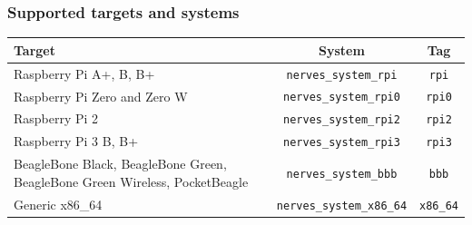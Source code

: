 \documentclass[10pt,xcolor=pdflatex,dvipsnames,table]{beamer}
\begin{document}
	\begin{frame}
		\frametitle{Supported targets and systems}

		\begin{center}
			\begin{tabular}{|p{3.2cm}|c|c|}\hline
				\textbf{Target}  & \textbf{System}  & \textbf{Tag} \\ \hline
				Raspberry Pi A+, B, B+  & \texttt{nerves\_system\_rpi} &  \texttt{rpi} \\
				Raspberry Pi Zero and Zero W & \texttt{nerves\_system\_rpi0} & \texttt{rpi0} \\
				Raspberry Pi 2 & \texttt{nerves\_system\_rpi2} & \texttt{rpi2} \\
				Raspberry Pi 3 B, B+ & \texttt{nerves\_system\_rpi3} & \texttt{rpi3} \\
				BeagleBone Black, BeagleBone Green, BeagleBone Green Wireless, PocketBeagle& \texttt{nerves\_system\_bbb} & \texttt{bbb} \\
				Generic x86\_64 & \texttt{nerves\_system\_x86\_64} & \texttt{x86\_64} \\ \hline
			\end{tabular}
		\end{center}


	\end{frame}
\end{document}
